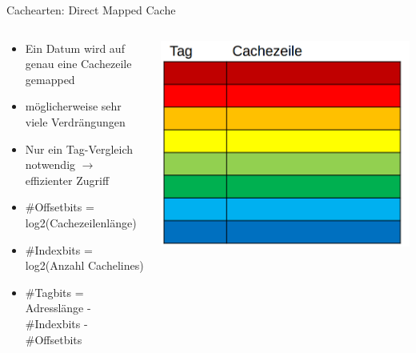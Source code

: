 \documentclass[
  german,            %
  aspectratio=169,    %
]{tumbeamer}
\begin{document}
\begin{frame}[c]{Cachearten: Direct Mapped Cache}{}
	\begin{columns}[c]
	  \begin{column}{0.5\textwidth}
		\begin{itemize}
		  \item Ein Datum wird auf genau eine Cachezeile gemapped
		  \item möglicherweise sehr viele Verdrängungen
		  \item Nur ein Tag-Vergleich notwendig $\rightarrow$ effizienter Zugriff
		  \item \#Offsetbits = log2(Cachezeilenlänge)
		  \item \#Indexbits = log2(Anzahl Cachelines)
		  \item \#Tagbits = Adresslänge - \#Indexbits - \#Offsetbits
		\end{itemize}
	  \end{column}
	  \begin{column}{0.5\textwidth}
		\includegraphics[width=\linewidth]{w05_directmapped_rep.png}
	  \end{column}
	\end{columns}
\end{frame}
  
\end{document}
